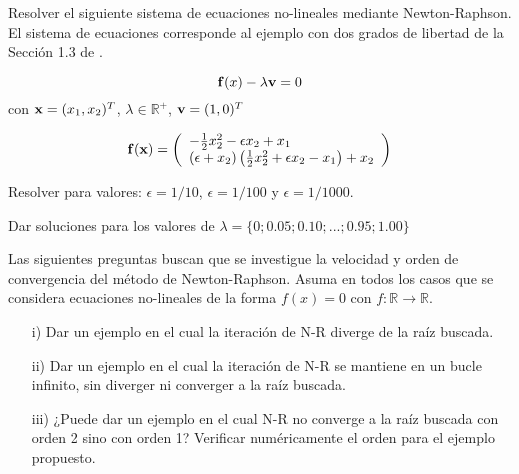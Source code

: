 
\begin{exercise}
	
	Resolver el siguiente sistema de ecuaciones no-lineales mediante Newton-Raphson. El sistema de ecuaciones corresponde al ejemplo con dos grados de libertad de la Sección 1.3 de \citep{crisfield1996non}.
	
	$$
	{\bf f}(x)-\lambda {\bf v} = 0
	$$
	con ${\bf x}=(x_1,x_2)^T$, $\lambda \in \mathbb{R}^+$, ${\bf v}=(1,0)^T$
	
	$${\bf f}({\bf x})= \left(\begin{array}{l}
		- \frac{1}{2} x_2^2 - \epsilon x_2 + x_1 \\
		(\epsilon+x_2)\left(\frac{1}{2}x_2^2+\epsilon x_2 -x_1\right)+x_2 
	\end{array}\right)$$
	
	\bigskip
	
	Resolver para valores: $\epsilon=1/10$, $\epsilon=1/100$ y $\epsilon=1/1000$. 
	
	Dar soluciones para los valores de $\lambda=\{0;0.05;0.10;...;0.95;1.00\}$
	
\end{exercise}



\bigskip
\begin{exercise}

Las siguientes preguntas buscan que se investigue la velocidad y orden de convergencia del método de Newton-Raphson. Asuma en todos los casos que se considera ecuaciones no-lineales de la forma
	$f(x)=0$ con $f:\mathbb{R}\rightarrow \mathbb{R}$.
	\begin{itemize}
		\item[i)] Dar un ejemplo en el cual la iteración de N-R diverge de la raíz buscada.
		
		\item[ii)] Dar un ejemplo en el cual la iteración de N-R se mantiene en un bucle infinito, sin diverger ni converger a la raíz buscada.
		
		\item[iii)] ¿Puede dar un ejemplo en el cual N-R no converge a la raíz buscada con orden 2 sino con orden 1? Verificar numéricamente el orden para el ejemplo propuesto.
	\end{itemize}
	
\end{exercise}


